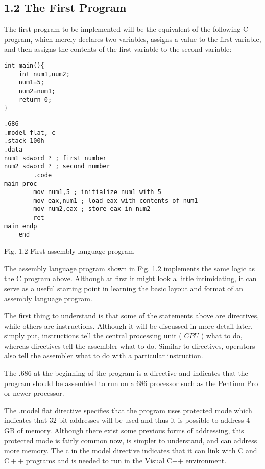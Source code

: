 \documentclass[10pt]{article}
\begin{document}
\subsection*{1.2 The First Program}
The first program to be implemented will be the equivalent of the following C program, which merely declares two variables, assigns a value to the first variable, and then assigns the contents of the first variable to the second variable:

\begin{verbatim}
int main(){
    int num1,num2;
    num1=5;
    num2=num1;
    return 0;
}
\end{verbatim}

\begin{verbatim}
.686
.model flat, c
.stack 100h
.data
num1 sdword ? ; first number
num2 sdword ? ; second number
        .code
main proc
        mov num1,5 ; initialize num1 with 5
        mov eax,num1 ; load eax with contents of num1
        mov num2,eax ; store eax in num2
        ret
main endp
    end
\end{verbatim}

Fig. 1.2 First assembly language program

The assembly language program shown in Fig. 1.2 implements the same logic as the C program above. Although at first it might look a little intimidating, it can serve as a useful starting point in learning the basic layout and format of an assembly language program.

The first thing to understand is that some of the statements above are directives, while others are instructions. Although it will be discussed in more detail later, simply put, instructions tell the central processing unit ( $C P U$ ) what to do, whereas directives tell the assembler what to do. Similar to directives, operators also tell the assembler what to do with a particular instruction.

The .686 at the beginning of the program is a directive and indicates that the program should be assembled to run on a 686 processor such as the Pentium Pro or newer processor.

The .model flat directive specifies that the program uses protected mode which indicates that 32-bit addresses will be used and thus it is possible to address 4 GB of memory. Although there exist some previous forms of addressing, this protected mode is fairly common now, is simpler to understand, and can address more memory. The c in the model directive indicates that it can link with C and $\mathrm{C}++$ programs and is needed to run in the Visual C++ environment.
\end{document}
